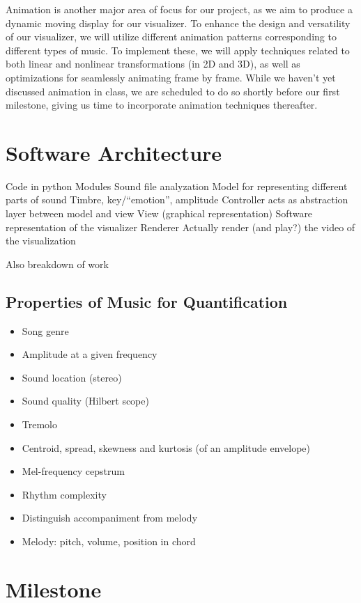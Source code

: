 \documentclass{article}
\begin{document}
Animation is another major area of focus for our project, as we aim to produce a dynamic moving display for our visualizer. To enhance the design and versatility of our visualizer, we will utilize different animation patterns corresponding to different types of music. To implement these, we will apply techniques related to both linear and nonlinear transformations (in 2D and 3D), as well as optimizations for seamlessly animating frame by frame. While we haven't yet discussed animation in class, we are scheduled to do so shortly before our first milestone, giving us time to incorporate animation techniques thereafter.

\section{Software Architecture}

Code in python
Modules
Sound file analyzation
Model for representing different parts of sound
Timbre, key/``emotion'', amplitude
Controller acts as abstraction layer between model and view
View (graphical representation)
Software representation of the visualizer
Renderer
Actually render (and play?) the video of the visualization

Also breakdown of work

\subsection{Properties of Music for Quantification}

\begin{itemize}
	\item Song genre
	\item Amplitude at a given frequency
	\item Sound location (stereo)
	\item Sound quality (Hilbert scope)
	\item Tremolo
	\item Centroid, spread, skewness and kurtosis (of an amplitude envelope)
	\item Mel-frequency cepstrum
	\item Rhythm complexity
	\item Distinguish accompaniment from melody
	\item Melody: pitch, volume, position in chord
\end{itemize}

\section{Milestone}
\end{document}
